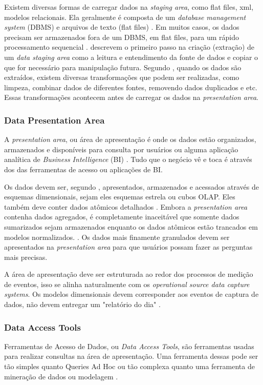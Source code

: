 Existem diversas formas de carregar dados na \textit{staging area}, como flat files, xml, modelos relacionais. Ela geralmente é composta de um \textit{database management system} (DBMS) e arquivos de texto (flat files) \citep{kimball2004}. Em muitos casos, os dados precisam ser armazenados fora de um DBMS, em flat files, para um rápido processamento sequencial \citep{kimball2004}.
 descrevem o primeiro passo na criação (extração) de um \textit{data staging area} como a leitura e entendimento da fonte de dados e copiar o que for necessário para manipulação futura. Segundo , quando os dados são extraídos, existem diversas transformações que podem ser realizadas, como limpeza, combinar dados de diferentes fontes, removendo dados duplicados e etc. Essas transformações acontecem antes de carregar os dados na \textit{presentation area}.

\subsubsection{Data Presentation Area}
A \textit{presentation area}, ou área de apresentação é onde os dados estão organizados, armazenados e disponíveis para consulta por usuários ou alguma aplicação analítica de \textit{Business Intelligence} (BI) \citep{kimball2013}. Tudo que o negócio vê e toca é através dos das ferramentas de acesso ou aplicações de BI.

Os dados devem ser, segundo  , apresentados, armazenados e acessados através de esquemas dimensionais, sejam eles esquemas estrela ou cubos OLAP. Eles também deve conter dados atômicos detalhados \citep{kimball2013}.  Embora a \textit{presentation area} contenha dados agregados, é completamente inaceitável que somente dados sumarizados sejam armazenados enquanto os dados atômicos estão trancados em modelos normalizados. \citep{kimball2013}. Os dados mais finamente granulados devem ser apresentados na \textit{presentation area} para que usuários possam fazer as perguntas mais precisas.

A área de apresentação deve ser estruturada ao redor dos processos de medição de eventos, isso se alinha naturalmente com os \textit{operational source data capture systems}. Os modelos dimensionais devem corresponder aos eventos de captura de dados, não devem entregar um "relatório do dia" \citep{jmj}. 

\subsubsection{Data Access Tools} Ferramentas de Acesso de Dados, ou \textit{Data Access Tools}, são ferramentas usadas para realizar consultas na área de apresentação. Uma ferramenta dessas pode ser tão simples quanto Queries Ad Hoc ou tão complexa quanto uma ferramenta de mineração de dados ou modelagem \citep{kimball2013}. 

